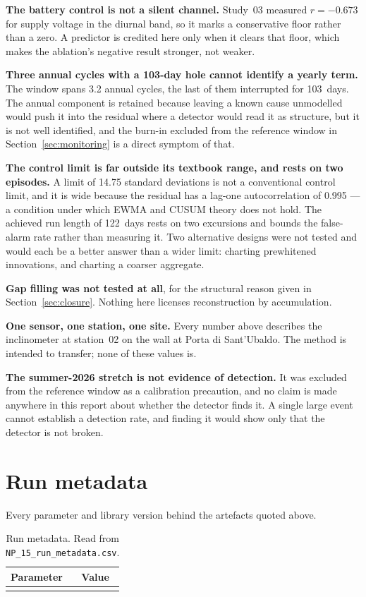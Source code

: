 \documentclass[11pt,a4paper]{article}
\begin{document}
\textbf{The battery control is not a silent channel.} Study~03 measured
$r = -0.673$ for supply voltage in the diurnal band, so it marks a conservative
floor rather than a zero. A predictor is credited here only when it clears that
floor, which makes the ablation's negative result stronger, not weaker.

\textbf{Three annual cycles with a 103-day hole cannot identify a yearly term.}
The window spans 3.2 annual cycles, the last of them interrupted for 103~days.
The annual component is retained because leaving a known cause unmodelled would
push it into the residual where a detector would read it as structure, but it is
not well identified, and the burn-in excluded from the reference window in
Section~\ref{sec:monitoring} is a direct symptom of that.

\textbf{The control limit is far outside its textbook range, and rests on two
episodes.} A limit of 14.75 standard deviations is not a conventional control
limit, and it is wide because the residual has a lag-one autocorrelation of
0.995 --- a condition under which EWMA and CUSUM theory does not hold. The
achieved run length of 122~days rests on two excursions and bounds the
false-alarm rate rather than measuring it. Two alternative designs were not
tested and would each be a better answer than a wider limit: charting prewhitened
innovations, and charting a coarser aggregate.

\textbf{Gap filling was not tested at all}, for the structural reason given in
Section~\ref{sec:closure}. Nothing here licenses reconstruction by accumulation.

\textbf{One sensor, one station, one site.} Every number above describes the
inclinometer at station~02 on the wall at Porta di Sant'Ubaldo. The method is
intended to transfer; none of these values is.

\textbf{The summer-2026 stretch is not evidence of detection.} It was excluded
from the reference window as a calibration precaution, and no claim is made
anywhere in this report about whether the detector finds it. A single large event
cannot establish a detection rate, and finding it would show only that the
detector is not broken.

\section{Run metadata}
\label{sec:metadata}

Every parameter and library version behind the artefacts quoted above.

\begin{table}[H]
\centering
\caption{Run metadata. Read from \texttt{NP\_15\_run\_metadata.csv}.}
\label{tab:metadata}
\begin{tabular}{ll}
\toprule
Parameter & Value \\
\midrule
\\
\bottomrule
\end{tabular}
\end{table}
\end{document}

